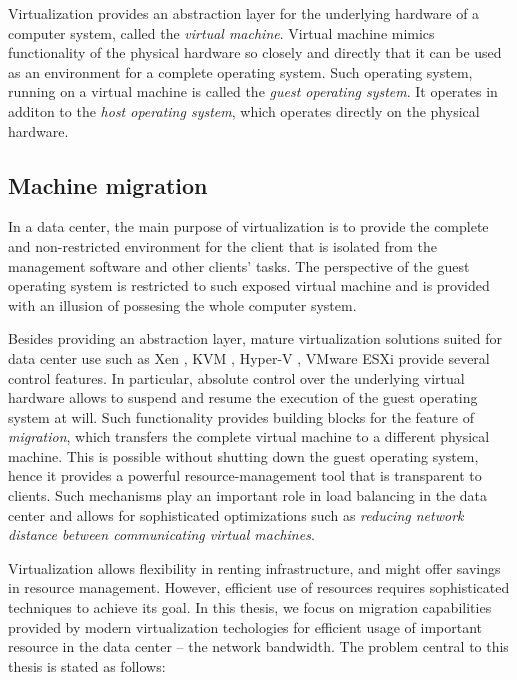 Virtualization provides an abstraction layer for the underlying hardware of a computer system, called the \emph{virtual machine}.
Virtual machine mimics functionality of the physical hardware so closely and
directly that it can be used as an environment for a complete operating system.
Such operating system, running on a virtual machine is called the \emph{guest
operating system}. It operates in additon to the \emph{host operating
system}, which operates directly on the physical hardware. 

\subsection{Machine migration}

In a data center, the main purpose of virtualization is to provide the complete and non-restricted environment for the client that is isolated from the management software and other clients' tasks.
The perspective of the guest operating system is restricted to such exposed virtual machine and is provided with an illusion of possesing the whole computer system.


Besides providing an abstraction layer, mature virtualization solutions suited for data center use such as Xen
\cite{url-xen}, KVM \cite{url-kvm}, Hyper-V \cite{url-hyperv}, VMware ESXi
\cite{url-vmware} provide several control features.
In particular, absolute control over the underlying virtual hardware allows to suspend and resume the execution of the guest operating system at will.
Such functionality provides building blocks for the feature of \emph{migration}, which transfers the complete virtual machine to a different physical machine.
This is possible without shutting down the guest operating system, hence it provides a powerful resource-management tool that is transparent to clients.
Such mechanisms play an important role in load balancing in the data center and allows for sophisticated optimizations such as \emph{reducing network distance between communicating virtual machines}.

Virtualization allows flexibility in renting infrastructure, and might offer savings in resource management.
However, efficient use of resources requires sophisticated techniques to achieve its goal.
In this thesis, we focus on migration capabilities provided by modern virtualization techologies for efficient usage of important resource in the data center -- the network bandwidth.
The problem central to this thesis is stated as follows:

